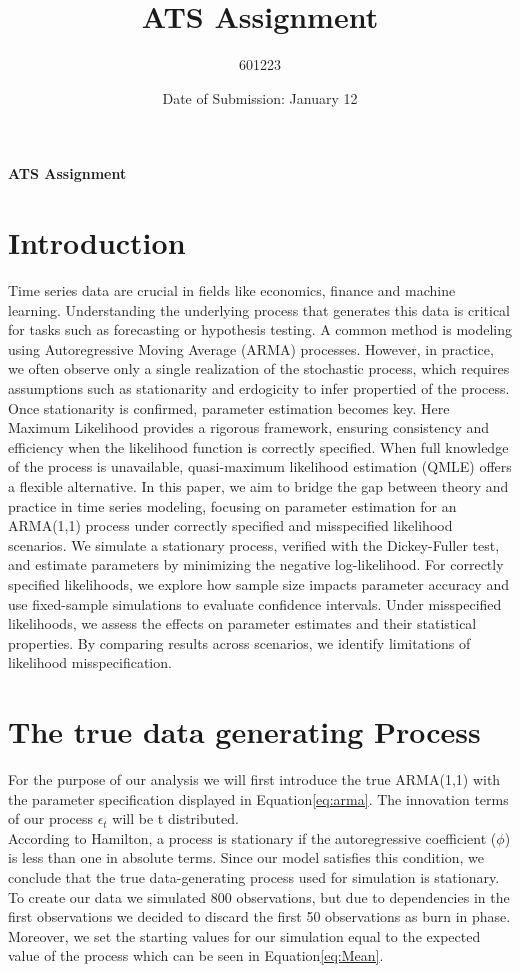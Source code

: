 \documentclass[11pt]{article}
\begin{document}
\clearpage
\title{ATS Assignment}
\author{601223}
\date{Date of Submission: January 12}

\begin{titlepage}
\textbf{\Large ATS Assignment}
\end{titlepage}

\tableofcontents

\newpage

\section{Introduction}
Time series data are crucial in fields like economics, finance and machine learning. 
Understanding the underlying process that generates this data is critical for tasks such as forecasting or hypothesis testing. A common method is modeling using Autoregressive Moving Average (ARMA) processes.
However, in practice, we often observe only a single realization of the stochastic process, which requires assumptions such as stationarity and erdogicity to infer propertied of the process.
Once stationarity is confirmed, parameter estimation becomes key. 
Here Maximum Likelihood provides a rigorous framework, ensuring consistency and efficiency when the likelihood function is correctly specified. When full knowledge of the process is unavailable, quasi-maximum likelihood estimation (QMLE) offers a flexible alternative.
In this paper, we aim to bridge the gap between theory and practice in time series modeling, focusing on parameter estimation for an ARMA(1,1) process under correctly specified and misspecified likelihood scenarios. 
We simulate a stationary process, verified with the Dickey-Fuller test, and estimate parameters by minimizing the negative log-likelihood.
For correctly specified likelihoods, we explore how sample size impacts parameter accuracy and use fixed-sample simulations to evaluate confidence intervals. Under misspecified likelihoods, we assess the effects on parameter estimates and their statistical properties. By comparing results across scenarios, we identify limitations of likelihood misspecification.


\section{The true data generating Process}
For the purpose of our analysis we will first introduce the true ARMA(1,1) with the parameter specification displayed in Equation\eqref{eq:arma}.
The innovation terms of our process $\epsilon_t$ will be t distributed.\\
According to Hamilton, a process is stationary if the autoregressive coefficient ($\phi$) is less than one in absolute terms. Since our model satisfies this condition, we conclude that the true data-generating process used for simulation is stationary.
To create our data we simulated 800 observations, but due to dependencies in the first observations we decided to discard the first 50 observations as burn in phase. Moreover, we set the starting values for our simulation equal to the expected value of the process which can be seen in Equation\eqref{eq:Mean}.
\end{document}
